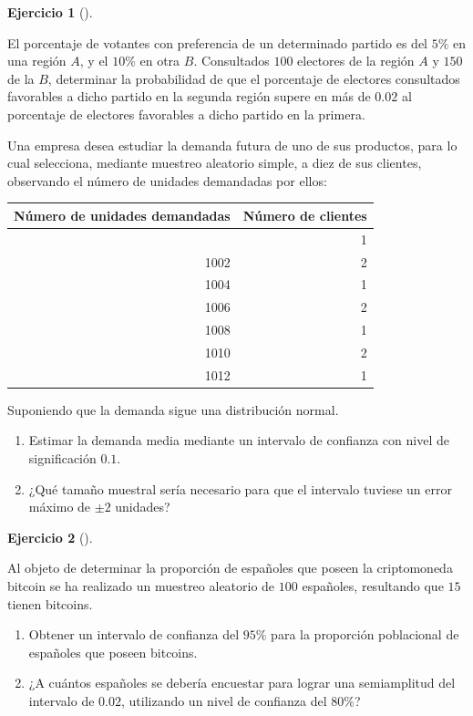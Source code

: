 \documentclass[
  a4paper,
]{scrreport}
\providecommand{\tightlist}{%
  \setlength{\itemsep}{0pt}\setlength{\parskip}{0pt}}\usepackage{longtable,booktabs,array}
\theoremstyle{definition}
\newtheorem{exercise}{Ejercicio}[chapter]
\theoremstyle{remark}
\begin{document}
\begin{exercise}[]\protect\hypertarget{exr-diferencia-proporciones-votos}{}\label{exr-diferencia-proporciones-votos}

El porcentaje de votantes con preferencia de un determinado partido es
del \(5\)\% en una región \(A\), y el \(10\)\% en otra \(B\).
Consultados \(100\) electores de la región \(A\) y \(150\) de la \(B\),
determinar la probabilidad de que el porcentaje de electores consultados
favorables a dicho partido en la segunda región supere en más de
\(0.02\) al porcentaje de electores favorables a dicho partido en la
primera.

\end{exercise}

Una empresa desea estudiar la demanda futura de uno de sus productos,
para lo cual selecciona, mediante muestreo aleatorio simple, a diez de
sus clientes, observando el número de unidades demandadas por ellos:

\begin{longtable}[]{@{}rr@{}}
\toprule\noalign{}
Número de unidades demandadas & Número de clientes \\
\midrule\noalign{}
\endhead
\bottomrule\noalign{}
\endlastfoot
1000 & 1 \\
1002 & 2 \\
1004 & 1 \\
1006 & 2 \\
1008 & 1 \\
1010 & 2 \\
1012 & 1 \\
\end{longtable}

Suponiendo que la demanda sigue una distribución normal.

\begin{enumerate}
\def\labelenumi{\alph{enumi}.}
\tightlist
\item
  Estimar la demanda media mediante un intervalo de confianza con nivel
  de significación \(0.1\).
\item
  ¿Qué tamaño muestral sería necesario para que el intervalo tuviese un
  error máximo de \(\pm 2\) unidades?
\end{enumerate}

\begin{exercise}[]\protect\hypertarget{exr-intervalo-confianza-media-bitcoin}{}\label{exr-intervalo-confianza-media-bitcoin}

Al objeto de determinar la proporción de españoles que poseen la
criptomoneda bitcoin se ha realizado un muestreo aleatorio de \(100\)
españoles, resultando que \(15\) tienen bitcoins.

\begin{enumerate}
\def\labelenumi{\alph{enumi}.}
\item
  Obtener un intervalo de confianza del \(95\)\% para la proporción
  poblacional de españoles que poseen bitcoins.
\item
  ¿A cuántos españoles se debería encuestar para lograr una semiamplitud
  del intervalo de \(0.02\), utilizando un nivel de confianza del
  \(80\)\%?
\end{enumerate}

\end{exercise}
\end{document}
